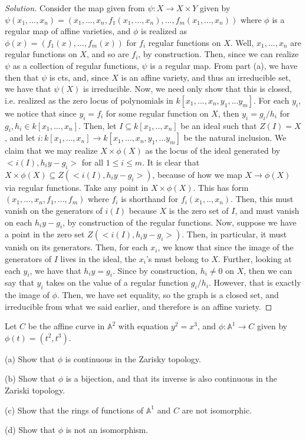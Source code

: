 \documentclass[10pt]{article}
\newenvironment{problem}[2][Problem]{\begin{trivlist}
\item[\hskip \labelsep {\bfseries #1}\hskip \labelsep {\bfseries #2.}]}{\end{trivlist}}
\begin{document}
\begin{proof}[Solution]
Consider the map given from $\psi: X \to X \times Y$ given by $\psi(x_1,...,x_n) = (x_1,...,x_n,f_1(x_1,...,x_n),...,f_m(x_1,...,x_n))$ where $\phi$ is a regular map of affine varieties, and $\phi$ is realized as $\phi(x) = (f_1(x),...,f_m(x))$ for $f_i$ regular functions on $X$. Well, $x_1,...,x_n$ are regular functions on $X$, and so are $f_i$, by construction. Then, since we can realize $\psi$ as a collection of regular functions, $\psi$ is a regular map. From part (a), we have then that $\psi$ is cts, and, since $X$ is an affine variety, and thus an irreducible set, we have that $\psi(X)$ is irreducible. Now, we need only show that this is closed, i.e. realized as the zero locus of polynomials in $k[x_1,...,x_n,y_1,...y_m]$. For each $y_i$, we notice that since $y_i = f_i$ for some regular function on $X$, then $y_i = g_i/h_i$ for $g_i,h_i \in k[x_1,...,x_n]$. Then, let $I \subseteq k[x_1,..,x_n]$ be an ideal such that $Z(I) = X$, and let $i: k[x_1,...,x_n] \to k[x_1,...,x_n,y_1,...y_m]$ be the natural inclusion. We claim that we may realize $X \times \phi(X)$ as the locus of the ideal generated by $< i(I), h_i y - g_i >$ for all $1 \leq i \leq m$. It is clear that $X \times \phi(X) \subseteq Z(< i(I), h_i y - g_i >)$, because of how we map $X \to \phi(X)$ via regular functions. Take any point in $X \times \phi(X)$. This has form $(x_1,...,x_n,f_1,...,f_m)$ where $f_i$ is shorthand for $f_i(x_1,..,x_n)$. Then, this must vanish on the generators of $i(I)$ because $X$ is the zero set of $I$, and must vanish on each $ h_i y - g_i $, by construction of the regular functions. Now, suppose we have a point in the zero set $ Z(< i(I), h_i y - g_i >)$. Then, in particular, it must vanish on its generators. Then, for each $x_i$, we know that since the image of the generators of $I$ lives in the ideal, the $x_i$'s must belong to $X$. Further, looking at each $y_i$, we have that $h_i y = g_i$. Since by construction, $h_i \not = 0$ on $X$, then we can say that $y_i$ takes on the value of a regular function $g_i/h_i$. However, that is exactly the image of $\phi$. Then, we have set equality, so the graph is a closed set, and irreducible from what we said earlier, and therefore is an affine variety.

\end{proof}

\begin{problem}{4.2}

Let $C$ be the affine curve in $\mathbb{A}^2$ with equation $y^2 = x^3$, and $\phi: \mathbb{A}^1 \to C$ given by $\phi(t) = (t^2,t^3)$.

(a) Show that $\phi$ is continuous in the Zarisky topology.

(b) Show that $\phi$ is a bijection, and that its inverse is also continuous in the Zariski topology.

(c) Show that the rings of functions of $\mathbb{A}^1$ and $C$ are not isomorphic.

(d) Show that $\phi$ is not an isomorphism.


\end{problem}
\end{document}
